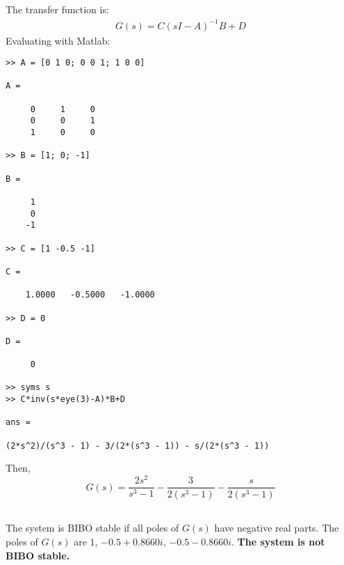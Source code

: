 \subsection{}
The transfer function is:
\begin{align*}
    G(s) = C(sI - A)^{-1}B + D
\end{align*}
Evaluating with Matlab:
\begin{verbatim}
>> A = [0 1 0; 0 0 1; 1 0 0]

A =

     0     1     0
     0     0     1
     1     0     0

>> B = [1; 0; -1]

B =

     1
     0
    -1

>> C = [1 -0.5 -1]

C =

    1.0000   -0.5000   -1.0000

>> D = 0

D =

     0

>> syms s
>> C*inv(s*eye(3)-A)*B+D
 
ans =
 
(2*s^2)/(s^3 - 1) - 3/(2*(s^3 - 1)) - s/(2*(s^3 - 1))
\end{verbatim}
Then,
\begin{equation*}
    \boxed{G(s) = \frac{2s^2}{s^3 - 1} - \frac{3}{2(s^3 - 1)} - \frac{s}{2(s^3 - 1)}}
\end{equation*}

\subsection{}
The system is BIBO stable if all poles of $G(s)$ have negative real parts. The poles of $G(s)$ are $1$, $-0.5 + 0.8660i$, $-0.5 - 0.8660i$.
\textbf{The system is not BIBO stable.}